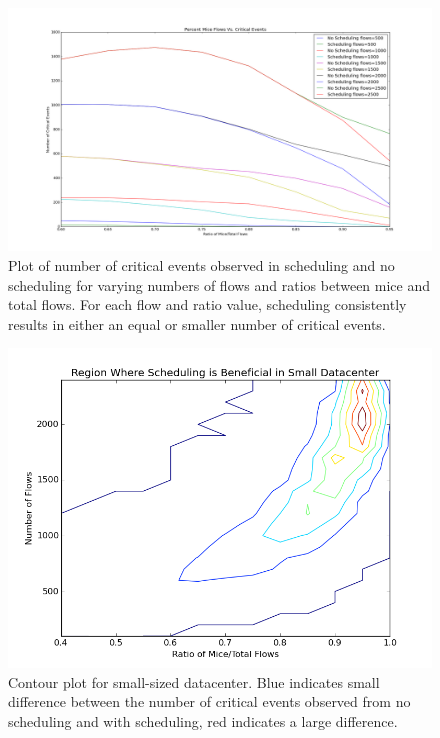 \fi

\begin{figure}
	\centering
	\includegraphics[width=\columnwidth]{crit_plot.png}
	\caption{Plot of number of critical events observed in scheduling and no
    scheduling for varying numbers of flows and ratios between mice and total
    flows. For each flow and ratio value, scheduling consistently results in
    either an equal or smaller number of critical events.}
	\label{fig:critplt}
\end{figure}

\begin{figure}
	\centering
	\includegraphics[width=\columnwidth]{small_datacenter.png}
	\caption{Contour plot for small-sized datacenter. Blue indicates small
    difference between the number of critical events observed from no
    scheduling and with scheduling, red indicates a large difference.}
	\label{fig:smalldc}
\end{figure}

